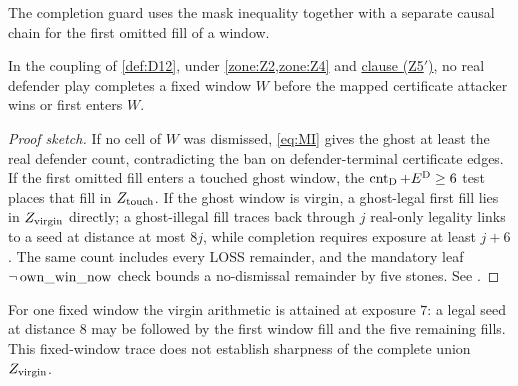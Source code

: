 The completion guard uses the mask inequality together with a separate
causal chain for the first omitted fill of a window.

\begin{lemma}
\label{lem:L12}
In the coupling of \cref{def:D12}, under \cref{zone:Z2,zone:Z4} and
\hyperref[zone:Z5prime]{clause \textup{(Z5$'$)}}, no real defender play
completes a fixed window $W$ before the mapped certificate attacker wins or
first enters $W$.
\end{lemma}

\begin{proof}[Proof sketch]
If no cell of $W$ was dismissed, \eqref{eq:MI} gives the ghost at least the
real defender count, contradicting the ban on defender-terminal certificate
edges.  If the first omitted fill enters a touched ghost window, the
$\operatorname{cnt}_{\mathrm{D}}+E^{\mathrm{D}}\ge6$ test places that fill in $Z_{\mathrm{touch}}$.  If the ghost window is
virgin, a ghost-legal first fill lies in $Z_{\mathrm{virgin}}$ directly; a ghost-illegal
fill traces back through $j$ real-only legality links to a seed at distance at
most $8j$, while completion requires exposure at least $j+6$.  The same
count includes every LOSS remainder, and the mandatory leaf
$\neg\operatorname{own\_win\_now}$ check bounds a no-dismissal remainder by five stones.  See
\cite{hexobot-companions}.
\end{proof}

For one fixed window the virgin arithmetic is attained at exposure $7$: a
legal seed at distance $8$ may be followed by the first window fill and the
five remaining fills.  This fixed-window trace does not establish sharpness
of the complete union $Z_{\mathrm{virgin}}$.
